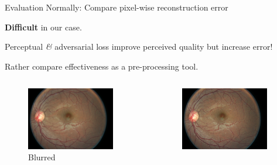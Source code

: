 \documentclass{beamer}
\begin{document}
\begin{frame}{Evaluation}
  Normally: Compare pixel-wise reconstruction error

  \textbf{Difficult} in our case.

  Perceptual \textit{\&} adversarial loss improve perceived quality but increase error!

  Rather compare effectiveness as a pre-processing tool.
\begin{columns}
  \begin{column}{0.33\linewidth}
    \begin{figure}[h]
      \centering
        \includegraphics[width=0.9\textwidth]{eyepacs_example_blur}
      \caption*{Blurred}
    \end{figure}
  \end{column}
  \begin{column}{0.33\linewidth}
    \begin{figure}[h]
      \centering
        \includegraphics[width=0.9\textwidth]{eyepacs_example_sharp}

\end{figure}
\end{column}
\end{columns}
\end{frame}
\end{document}

